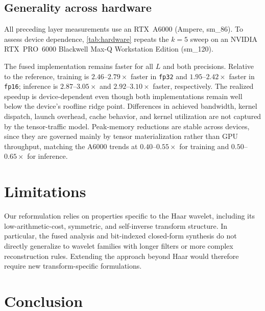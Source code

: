 \documentclass[10pt]{article} %
\theoremstyle{plain}
\begin{document}



\subsection{Generality across hardware}
\label{sec:results-hardware}



All preceding layer measurements use an RTX~A6000 (Ampere, sm\_86). To assess device dependence,
\autoref{tab:hardware} repeats the $k{=}5$ sweep on an NVIDIA RTX~PRO~6000 Blackwell Max-Q
Workstation Edition (sm\_120).

The fused implementation remains faster for all $L$ and both precisions. Relative to the
reference, training is $2.46$--$2.79\times$ faster in \texttt{fp32} and $1.95$--$2.42\times$ faster
in \texttt{fp16}; inference is $2.87$--$3.05\times$ and $2.92$--$3.10\times$ faster, respectively.
The realized speedup is device-dependent even though both implementations remain well below the device’s roofline ridge point. Differences in achieved bandwidth, kernel dispatch, launch overhead, cache behavior, and kernel utilization are not captured by the tensor-traffic model. Peak-memory
reductions are stable across devices, since they are governed mainly by tensor materialization
rather than GPU throughput, matching the A6000 trends at $0.40$--$0.55\times$ for training and
$0.50$--$0.65\times$ for inference.




\section{Limitations}

Our reformulation relies on properties specific to the Haar wavelet, including its low-arithmetic-cost, symmetric, and self-inverse transform structure. In particular, the fused analysis and bit-indexed closed-form synthesis do not directly generalize to wavelet families with longer filters or more complex reconstruction rules. Extending the approach beyond Haar would therefore require new transform-specific formulations.



\section{Conclusion}
\end{document}
